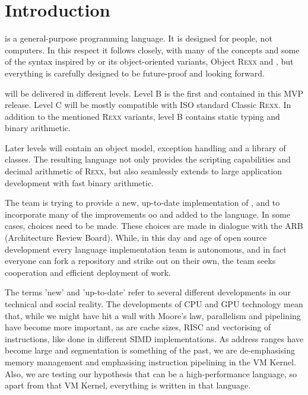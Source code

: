 \chapter{Introduction}

\crexx{} is a general-purpose programming language. It is designed for
people, not computers. In this respect it follows \rexx{} closely, with
many of the concepts and some of the syntax inspired by \rexx{}
or its object-oriented variants, Object R\textsc{exx} and \nr{}, but
everything is carefully designed to be future-proof and looking
forward.

\crexx{} will be delivered in different levels. Level B is the first and
contained in this MVP release. Level C will be mostly compatible with
ISO standard Classic \textsc{Rexx}. 
In addition to the mentioned \textsc{Rexx} variants, \crexx{} level B contains 
static typing and binary arithmetic.

Later levels will contain an object model, exception
handling and a library of classes. The resulting language not only provides the scripting
capabilities and decimal arithmetic of R\textsc{exx}, but also seamlessly
extends to large application development with fast binary arithmetic.

The \crexx{} team is trying to provide a new, up-to-date
implementation of \rexx{}, and to incorporate many of the improvements
oo\rexx{} and \nr{} added to the language. In some cases, choices
need to be made. These choices are made in dialogue with the \rexx ARB
(Architecture Review Board). While, in this day and age of open source
development every language implementation team is autonomous, and in
fact everyone can fork a repository and strike out on their own, the
\crexx{} team seeks cooperation and efficient deployment of work.

The terms 'new' and 'up-to-date' refer to several different
developments in our technical and social reality. The developments of
CPU and GPU technology mean that, while we might have hit a wall with
Moore's law, parallelism and pipelining have become more important,
as are cache sizes, RISC and vectorising of instructions, like done in
different SIMD implementations. As address ranges have become large
and segmentation is something of the past, we are de-emphasising
memory management and emphasising instruction pipelining in the
\crexx{} VM Kernel. Also, we are testing our hypothesis that \rexx{}
can be a high-performance language, so apart from that VM Kernel,
everything is written in that language.

